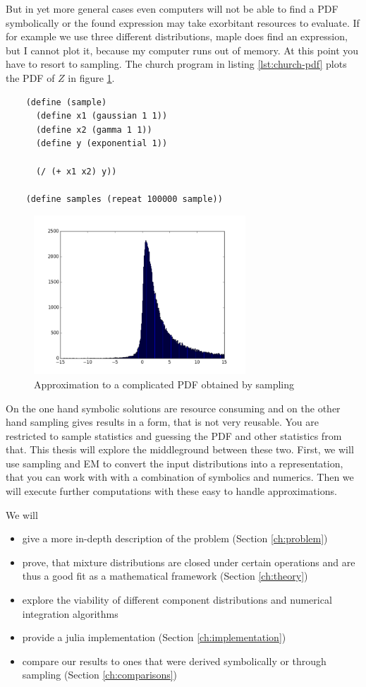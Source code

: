 \documentclass[11pt,a4paper]{book}
\begin{document}
But in yet more general cases even computers will not be able to find a PDF
symbolically or the found expression may take exorbitant resources to
evaluate. If for example we use three different distributions, maple does find
an expression, but I cannot plot it, because my computer runs out of memory. At
this point you have to resort to sampling. The church program in listing
\ref{lst:church-pdf} plots the PDF of $Z$ in figure \ref{fig:church-pdf}.
\begin{listing}
  \begin{verbatim}
    (define (sample)
      (define x1 (gaussian 1 1))
      (define x2 (gamma 1 1))
      (define y (exponential 1))

      (/ (+ x1 x2) y))

    (define samples (repeat 100000 sample))
  \end{verbatim}
  \caption{}
  \label{lst:church-pdf}
\end{listing}
\begin{figure}
  \centering
  \includegraphics[width=300px]{thesis/church-pdf}
  \caption{Approximation to a complicated PDF obtained by sampling}
  \label{fig:church-pdf}
\end{figure}

On the one hand symbolic solutions are resource consuming and on the other hand
sampling gives results in a form, that is not very reusable. You are restricted
to sample statistics and guessing the PDF and other statistics from that. This
thesis will explore the middleground between these two. First, we will use
sampling and EM to convert the input distributions into a representation, that
you can work with with a combination of symbolics and numerics. Then we will
execute further computations with these easy to handle approximations.

We will
\begin{itemize}
\item give a more in-depth description of the problem (Section \ref{ch:problem})
\item prove, that mixture distributions are closed under certain operations and
  are thus a good fit as a mathematical framework (Section \ref{ch:theory})
\item explore the viability of different component distributions and numerical
  integration algorithms
\item provide a julia implementation (Section \ref{ch:implementation})
\item compare our results to ones that were derived symbolically or through
  sampling (Section \ref{ch:comparisons})
\end{itemize}
\end{document}

